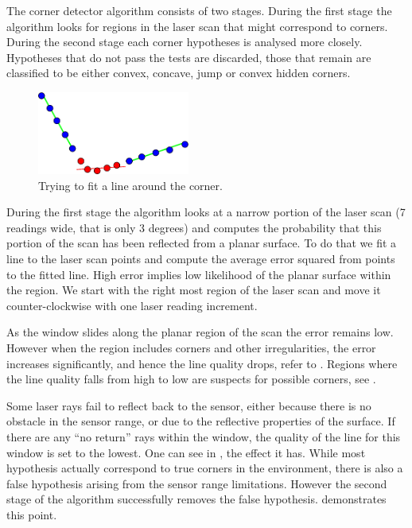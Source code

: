 The corner detector algorithm consists of two stages. During the first
stage the algorithm looks for regions in the laser scan that might
correspond to corners. During the second stage each corner hypotheses
is analysed more closely. Hypotheses that do not pass the tests are
discarded, those that remain are classified to be either convex,
concave, jump or convex hidden corners.

\begin{figure}[htbp]
  \centering
  \includegraphics[width=5cm]{Pics/fig_corner_example}
  \caption{Trying to fit a line around the corner.}
  \label{fig:corner_example}
\end{figure}

During the first stage the algorithm looks at a narrow portion of the
laser scan (7 readings wide, that is only 3 degrees) and computes the
probability that this portion of the scan has been reflected from a
planar surface. To do that we fit a line to the laser scan points
and compute the average error squared from points to the fitted line.
High error implies low likelihood of the planar surface within the
region. We start with the right most region of the laser scan and move
it counter-clockwise with one laser reading increment.

As the window slides along the planar region of the scan the error
remains low. However when the region includes corners and other
irregularities, the error increases significantly, and hence the line
quality drops, refer to . Regions where
the line quality falls from high to low are suspects for possible
corners, see .

Some laser rays fail to reflect back to the sensor, either because
there is no obstacle in the sensor range, or due to the reflective
properties of the surface. If there are any ``no return'' rays within
the window, the quality of the line for this window is set to the
lowest. One can see in , the
effect it has. While most hypothesis actually correspond to true
corners in the environment, there is also a false hypothesis arising
from the sensor range limitations. However the second stage of the
algorithm successfully removes the false hypothesis.
 demonstrates this point.

